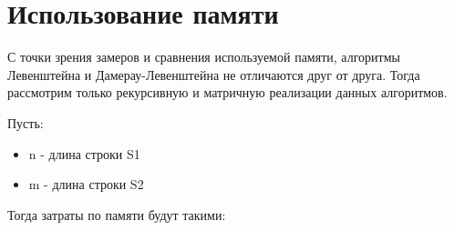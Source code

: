 \clearpage

\section{Использование памяти}

С точки зрения замеров и сравнения используемой памяти, алгоритмы Левенштейна и Дамерау-Левенштейна не отличаются друг от друга.
Тогда рассмотрим только рекурсивную и матричную реализации данных алгоритмов.

Пусть:
\begin{itemize}
    \item n - длина строки S1
    \item m - длина строки S2
\end{itemize}

Тогда затраты по памяти будут такими:
